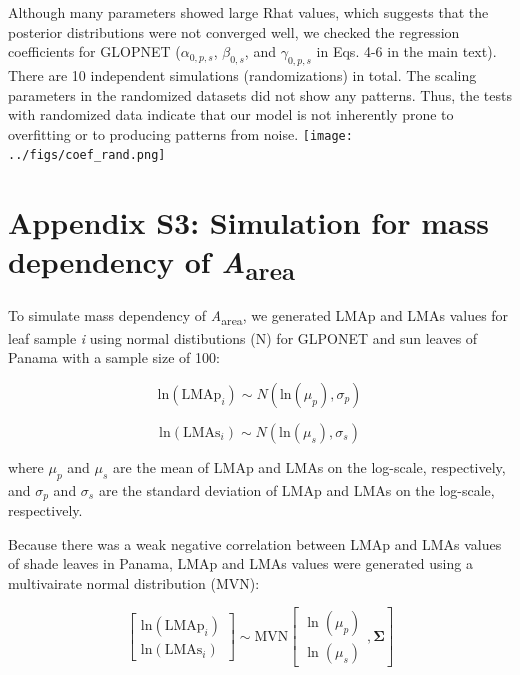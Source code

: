 \documentclass[
  12pt,
  letterpaper,
  DIV=11,
  numbers=noendperiod]{scrartcl}
\begin{document}
Although many parameters showed large Rhat values, which suggests that
the posterior distributions were not converged well, we checked the
regression coefficients for GLOPNET (\(\alpha_{0, p, s}\),
\(\beta_{0, s}\), and \(\gamma_{0, p, s}\) in Eqs. 4-6 in the main
text). There are 10 independent simulations (randomizations) in total.
The scaling parameters in the randomized datasets did not show any
patterns. Thus, the tests with randomized data indicate that our model
is not inherently prone to overfitting or to producing patterns from
noise. \texttt{[image: ../figs/coef\_rand.png]}

\newpage

\hypertarget{appendix-s3-simulation-for-mass-dependency-of-aarea}{%
\section{\texorpdfstring{Appendix S3: Simulation for mass dependency of
\emph{A}\textsubscript{area}}{Appendix S3: Simulation for mass dependency of Aarea}}\label{appendix-s3-simulation-for-mass-dependency-of-aarea}}

To simulate mass dependency of \emph{A}\textsubscript{area}, we
generated LMAp and LMAs values for leaf sample \emph{i} using normal
distibutions (N) for GLPONET and sun leaves of Panama with a sample size
of 100:

\[
\mathrm{ln}(\mathrm{LMAp}_{i}) \sim N(\mathrm{ln}(\mu_p), \sigma_p)
\]

\[
\mathrm{ln}(\mathrm{LMAs}_{i}) \sim N(\mathrm{ln}(\mu_s), \sigma_s)
\]

where \(\mu_p\) and \(\mu_s\) are the mean of LMAp and LMAs on the
log-scale, respectively, and \(\sigma_p\) and \(\sigma_s\) are the
standard deviation of LMAp and LMAs on the log-scale, respectively.

Because there was a weak negative correlation between LMAp and LMAs
values of shade leaves in Panama, LMAp and LMAs values were generated
using a multivairate normal distribution (MVN):

\[
\begin{bmatrix}
\mathrm{ln}(\mathrm{LMAp}_{i})\\
\mathrm{ln}(\mathrm{LMAs}_{i})
\end{bmatrix}
\sim \mathrm{MVN}
\left[
\begin{matrix}
\ln(\mu_{p})\\
\ln(\mu_{s})
\end{matrix}
,\mathbf{\Sigma}
\right]
\]
\end{document}
